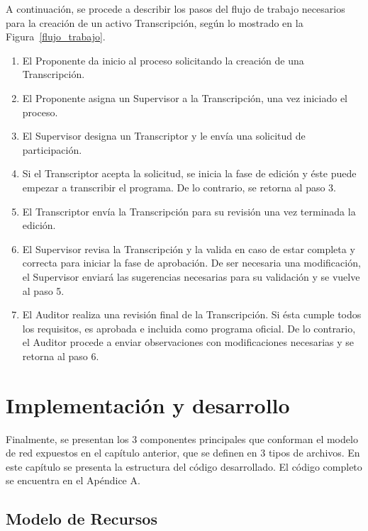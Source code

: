 A continuación, se procede a describir los pasos del flujo de trabajo necesarios para la creación de un activo Transcripción, según lo mostrado en la Figura~\ref{flujo_trabajo}.
\begin{enumerate}
    \item El Proponente da inicio al proceso solicitando la creación de una Transcripción.
    \item El Proponente asigna un Supervisor a la Transcripción, una vez iniciado el proceso.
    \item El Supervisor designa un Transcriptor y le envía una solicitud de participación.
     \item Si el Transcriptor acepta la solicitud, se inicia la fase de edición y éste puede empezar a transcribir el programa. De lo contrario, se retorna al paso 3.
     \item El Transcriptor envía la Transcripción para su revisión una vez terminada la edición.
     \item El Supervisor revisa la Transcripción y la valida en caso de estar completa y correcta para iniciar la fase de aprobación. De ser necesaria una modificación, el Supervisor enviará las sugerencias necesarias para su validación y se vuelve al paso 5.
     \item El Auditor realiza una revisión final de la Transcripción. Si ésta cumple todos los requisitos, es aprobada e incluida como programa oficial. De lo contrario, el Auditor procede a enviar observaciones con modificaciones necesarias y se retorna al paso 6.
\end{enumerate}

\section {Implementación y desarrollo}

Finalmente, se presentan los 3 componentes principales que conforman el modelo de red expuestos en el capítulo anterior, que se definen en 3 tipos de archivos. En este capítulo se presenta la estructura del código desarrollado. El código completo se encuentra en el Apéndice A. 

\subsection{Modelo de Recursos}

